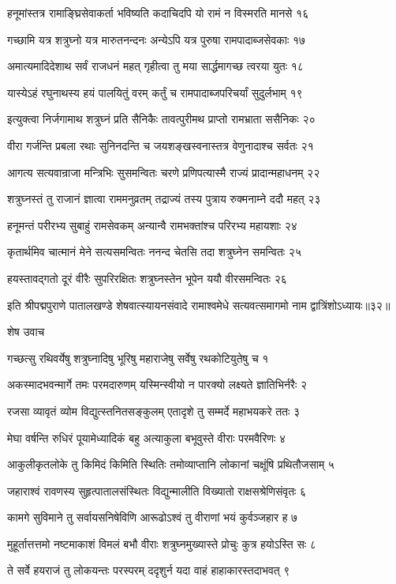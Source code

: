 हनूमांस्तत्र रामाङ्घ्रिसेवाकर्ता भविष्यति
कदाचिदपि यो रामं न विस्मरति मानसे १६

गच्छामि यत्र शत्रुघ्नो यत्र मारुतनन्दनः
अन्येऽपि यत्र पुरुषा रामपादाब्जसेवकाः १७

अमात्यमादिदेशाथ सर्वं राजधनं महत्
गृहीत्वा तु मया सार्द्धमागच्छ त्वरया युतः १८

यास्येऽहं रघुनाथस्य हयं पालयितुं वरम्
कर्तुं च रामपादाब्जपरिचर्यां सुदुर्लभाम् १९

इत्युक्त्वा निर्जगामाथ शत्रुघ्नं प्रति सैनिकैः
तावत्पुरीमथ प्राप्तो रामभ्राता ससैनिकः २०

वीरा गर्जन्ति प्रबला रथाः सुनिनदन्ति च
जयशङ्खस्वनास्तत्र वेणुनादाश्च सर्वतः २१

आगत्य सत्यवान्राजा मन्त्रिभिः सुसमन्वितः
चरणे प्रणिपत्यास्मै राज्यं प्रादान्महाधनम् २२

शत्रुघ्नस्तं तु राजानं ज्ञात्वा राममनुव्रतम्
तद्राज्यं तस्य पुत्राय रुक्मनाम्ने ददौ महत् २३

हनूमन्तं परीरभ्य सुबाहुं रामसेवकम्
अन्यान्वै रामभक्तांश्च परिरभ्य महायशाः २४

कृतार्थमिव चात्मानं मेने सत्यसमन्वितः
ननन्द चेतसि तदा शत्रुघ्नेन समन्वितः २५

हयस्तावद्गतो दूरं वीरैः सुपरिरक्षितः
शत्रुघ्नस्तेन भूपेन ययौ वीरसमन्वितः २६

इति श्रीपद्मपुराणे पातालखण्डे शेषवात्स्यायनसंवादे रामाश्वमेधे सत्यवत्समागमो नाम द्वात्रिंशोऽध्यायः॥३२॥


शेष उवाच

गच्छत्सु रथिवर्येषु शत्रुघ्नादिषु भूरिषु
महाराजेषु सर्वेषु रथकोटियुतेषु च १

अकस्मादभवन्मार्गे तमः परमदारुणम्
यस्मिन्स्वीयो न पारक्यो लक्ष्यते ज्ञातिभिर्नरैः २

रजसा व्यावृतं व्योम विद्युत्स्तनितसङ्कुलम्
एतादृशे तु सम्मर्दे महाभयकरे ततः ३

मेघा वर्षन्ति रुधिरं पूयामेध्यादिकं बहु
अत्याकुला बभूवुस्ते वीराः परमवैरिणः ४

आकुलीकृतलोके तु किमिदं किमिति स्थितिः
तमोव्याप्तानि लोकानां चक्षूंषि प्रथितौजसाम् ५

जहाराश्वं रावणस्य सुहृत्पातालसंस्थितः
विद्युन्मालीति विख्यातो राक्षसश्रेणिसंवृतः ६

कामगे सुविमाने तु सर्वायसनिषेविणि
आरूढोऽश्वं तु वीराणां भयं कुर्वञ्जहार ह ७

मुहूर्तात्तत्तमो नष्टमाकाशं विमलं बभौ
वीराः शत्रुघ्नमुख्यास्ते प्रोचुः कुत्र हयोऽस्ति सः ८

ते सर्वे हयराजं तु लोकयन्तः परस्परम्
ददृशुर्न यदा वाहं हाहाकारस्तदाभवत् ९

